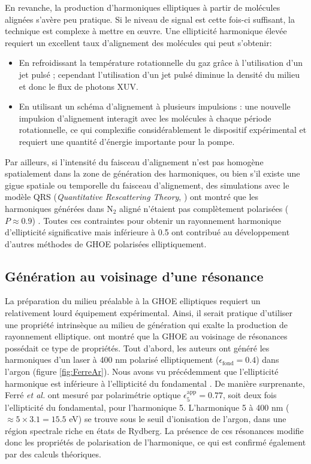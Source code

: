 En revanche, la production d'harmoniques elliptiques à partir de molécules alignées s'avère peu pratique. Si le niveau de signal est cette fois-ci suffisant, la technique est complexe à mettre en \oe uvre. Une ellipticité harmonique élevée requiert un excellent taux d'alignement des molécules qui peut s'obtenir:
\begin{itemize}
\item En refroidissant la température rotationnelle du gaz grâce à l'utilisation d'un jet pulsé ; cependant l'utilisation d'un jet pulsé diminue la densité du milieu et donc le flux de photons XUV.
\item En utilisant un schéma d'alignement à plusieurs impulsions : une nouvelle impulsion d'alignement interagit avec les molécules à chaque période rotationnelle, ce qui complexifie considérablement le dispositif expérimental et requiert une quantité d'énergie importante pour la pompe.
\end{itemize}
Par ailleurs, si l'intensité du faisceau d'alignement n'est pas homogène spatialement dans la zone de génération des harmoniques, ou bien s'il existe une gigue spatiale ou temporelle du faisceau d'alignement, des simulations avec le modèle QRS (\textit{Quantitative Rescattering Theory}, ) ont montré que les harmoniques générées dans N$_2$ aligné n'étaient pas complètement polarisées ($P \approx 0.9$) . Toutes ces contraintes pour obtenir un rayonnement harmonique d'ellipticité significative mais inférieure à 0.5 ont contribué au développement d'autres méthodes de GHOE polarisées elliptiquement.

\subsection{Génération au voisinage d'une résonance}
La préparation du milieu préalable à la GHOE elliptiques requiert un relativement lourd équipement expérimental. Ainsi, il serait pratique d'utiliser une propriété intrinsèque au milieu de génération qui exalte la production de rayonnement elliptique.  ont montré que la GHOE au voisinage de résonances possédait ce type de propriétés. Tout d'abord, les auteurs ont généré les harmoniques d'un laser à 400 nm polarisé elliptiquement ($\epsilon_{\text{fond}} = 0.4$) dans l'argon (figure \ref{fig:FerreAr}). Nous avons vu précédemment que l'ellipticité harmonique est inférieure à l'ellipticité du fondamental . De manière surprenante, Ferré \textit{et al.} ont mesuré par polarimétrie optique $\epsilon_5^{\text{app}} = 0.77$, soit deux fois l'ellipticité du fondamental, pour l'harmonique 5. L'harmonique 5 à 400 nm ($\approx 5 \times 3.1 = 15.5$ eV) se trouve sous le seuil d'ionisation de l'argon, dans une région spectrale riche en états de Rydberg. La présence de ces résonances modifie donc les propriétés de polarisation de l'harmonique, ce qui est confirmé également par des calculs théoriques.


